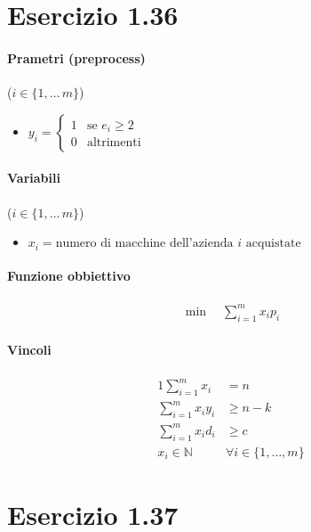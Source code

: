 \documentclass{article}
\begin{document}
\pagebreak
\section{Esercizio 1.36}

\paragraph{Prametri (preprocess)} ($i \in \{1,\ldots\,m\}$)
\begin{itemize}
  \item $y_i = \begin{cases}
      1 & \text{se }e_i \geq 2 \\
      0 & \text{altrimenti}
  \end{cases}$
\end{itemize}

\paragraph{Variabili} ($i \in \{1,\ldots\,m\}$)
\begin{itemize}
  \item $x_i = \text{numero di macchine dell'azienda }i\text{ acquistate}$
\end{itemize}

\paragraph{Funzione obbiettivo}
\begin{align*}
  \min \quad \sum_{i=1}^m x_i p_i
\end{align*}

\paragraph{Vincoli}
\begin{alignat}{1}
  \sum_{i=1}^m x_i &= n \\
  \sum_{i=1}^m x_i y_i &\geq n-k \\
  \sum_{i=1}^m x_i d_i &\geq c \\
  x_i \in \mathbb{N} \quad &\forall i \in \{1,\ldots,m\}
\end{alignat}

\pagebreak
\section{Esercizio 1.37}
\end{document}
